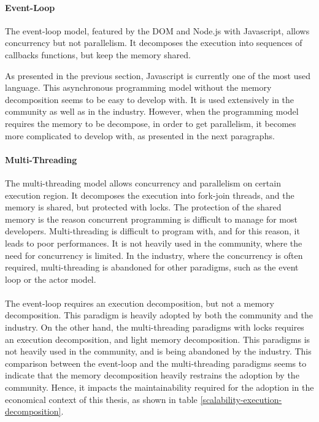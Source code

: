 \paragraph{Event-Loop}

The event-loop model, featured by the DOM and Node.js with Javascript, allows concurrency but not parallelism.
It decomposes the execution into sequences of callbacks functions, but keep the memory shared.

As presented in the previous section, Javascript is currently one of the most used language.
This asynchronous programming model without the memory decomposition seems to be easy to develop with.
It is used extensively in the community as well as in the industry.
However, when the programming model requires the memory to be decompose, in order to get parallelism, it becomes more complicated to develop with, as presented in the next paragraphs.

\paragraph{Multi-Threading}

The multi-threading model allows concurrency and parallelism on certain execution region.
It decomposes the execution into fork-join threads, and the memory is shared, but protected with locks.
The protection of the shared memory is the reason concurrent programming is difficult to manage for most developers.
Multi-threading is difficult to program with, and for this reason, it leads to poor performances.
It is not heavily used in the community, where the need for concurrency is limited.
In the industry, where the concurrency is often required, multi-threading is abandoned for other paradigms, such as the event loop or the actor model.

\paragraph{}

The event-loop requires an execution decomposition, but not a memory decomposition.
This paradigm is heavily adopted by both the community and the industry.
On the other hand, the multi-threading paradigms with locks requires an execution decomposition, and light memory decomposition.
This paradigms is not heavily used in the community, and is being abandoned by the industry.
This comparison between the event-loop and the multi-threading paradigms seems to indicate that the memory decomposition heavily restrains the adoption by the community.
Hence, it impacts the maintainability required for the adoption in the economical context of this thesis, as shown in table \ref{scalability-execution-decomposition}.

